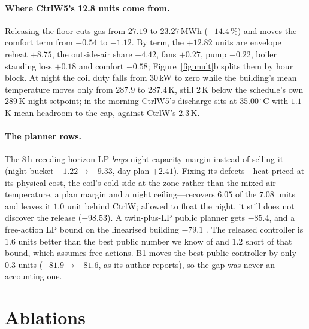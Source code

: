 \documentclass{article}
\begin{document}
\paragraph{Where CtrlW5's 12.8 units come from.} Releasing the floor cuts gas from $27.19$ to
$23.27$\,MWh ($-14.4\,\%$) and moves the comfort term from $-0.54$ to $-1.12$. By term, the
$+12.82$ units are envelope reheat $+8.75$, the outside-air share $+4.42$, fans $+0.27$, pump
$-0.22$, boiler standing loss $+0.18$ and comfort $-0.58$; Figure~\ref{fig:mult}b splits them by
hour block. At night the coil duty falls from 30\,kW to zero while the building's mean
temperature moves only from $287.9$ to $287.4$\,K, still 2\,K below the schedule's own 289\,K
night setpoint; in the morning CtrlW5's discharge sits at $35.00\,^\circ$C with $1.1$\,K mean
headroom to the cap, against CtrlW's $2.3$\,K.

\paragraph{The planner rows.} The 8\,h receding-horizon LP \emph{buys} night capacity margin
instead of selling it (night bucket $-1.22\to-9.33$, day plan $+2.41$). Fixing its
defects---heat priced at its physical cost, the coil's cold side at the zone rather than the
mixed-air temperature, a plan margin and a night ceiling---recovers $6.05$ of the $7.08$ units
and leaves it $1.0$ unit behind CtrlW; allowed to float the night, it still does not discover the
release ($-98.53$). A twin-plus-LP public planner gets $-85.4$, and a free-action LP bound on the
linearised building $-79.1$ \citep{alayet2026anchor}. The released controller is $1.6$ units
better than the best public number we know of and $1.2$ short of that bound, which assumes free
actions. B1 moves the best public controller by only $0.3$ units ($-81.9\to-81.6$, as its author
reports), so the gap was never an accounting one.


\section{Ablations}
\label{app:abl}
\end{document}
